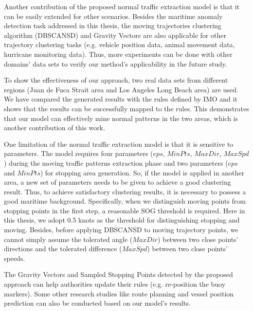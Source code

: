 \documentclass[12pt,glossary]{dalcsthesis}
\begin{document}
Another contribution of the proposed normal traffic extraction model is that it can be easily extended for other scenarios. Besides the maritime anomaly detection task addressed in this thesis, the moving trajectories clustering algorithm (DBSCANSD) and Gravity Vectors are also applicable for other trajectory clustering tasks (e.g. vehicle position data, animal movement data, hurricane monitoring data). Thus, more experiments can be done with other domains' data sets to verify our method's applicability in the future study.

To show the effectiveness of our approach, two real data sets from different regions (Juan de Fuca Strait area and Los Angeles Long Beach area) are used. We have compared the generated results with the rules defined by IMO and it shows that the results can be successfully mapped to the rules. This demonstrates that our model can effectively mine normal patterns in the two areas, which is another contribution of this work.

One limitation of the normal traffic extraction model is that it is sensitive to parameters. The model requires four parameters ($eps$, $MinPts$, $MaxDir$, $MaxSpd$) during the moving traffic patterns extraction phase and two parameters ($eps$ and $MinPts$) for stopping area generation. So, if the model is applied in another area, a new set of parameters needs to be given to achieve a good clustering result. Thus, to achieve satisfactory clustering results, it is necessary to possess a good maritime background. Specifically, when we distinguish moving points from stopping points in the first step, a reasonable SOG threshold is required. Here in this thesis, we adopt 0.5 knots as the threshold for distinguishing stopping and moving. Besides, before applying DBSCANSD to moving trajectory points, we cannot simply assume the tolerated angle ($MaxDir$) between two close points' directions and the tolerated difference ($MaxSpd$) between two close points' speeds.







The Gravity Vectors and Sampled Stopping Points detected by the proposed approach can help authorities update their rules (e.g. re-position the buoy markers).  Some other research studies like route planning and vessel position prediction can also be conducted based on our model's results. 
\end{document}
